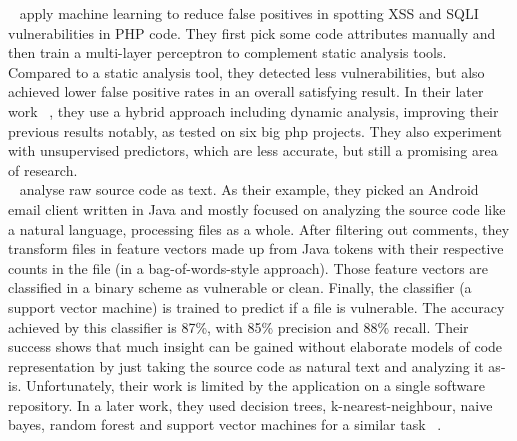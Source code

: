 \documentclass[
	a4paper,
	pagesize,
	pdftex,
	12pt,
	twoside, %
	BCOR=5mm, %
	ngerman,
	fleqn,
	final,
	]{scrartcl}
\begin{document}
~\cite{Shar.2013b} apply machine learning to reduce false positives in spotting XSS and SQLI vulnerabilities in PHP code. They first pick some code attributes manually and then train a multi-layer perceptron to complement static analysis tools. Compared to a static analysis tool, they detected less vulnerabilities, but also achieved lower false positive rates in an overall satisfying result. In their later work ~\cite{Shar.2013}, they use a hybrid approach including dynamic analysis, improving their previous results notably, as tested on six big php projects. They also experiment with unsupervised predictors, which are less accurate, but still a promising area of research. \\
~\cite{Hovsepyan.2012} analyse raw source code as text. As their example, they picked an Android email client written in Java and mostly focused on analyzing the source code like a natural language, processing files as a whole. After filtering out comments, they transform files in feature vectors made up from Java tokens with their respective counts in the file (in a bag-of-words-style approach). Those feature vectors are classified in a binary scheme as vulnerable or clean. Finally, the classifier (a support vector machine) is trained to predict if a file is vulnerable. The accuracy achieved by this classifier is 87\%, with 85\% precision and 88\% recall. Their success shows that much insight can be gained without elaborate models of code representation by just taking the source code as natural text and analyzing it as-is. Unfortunately, their work is limited by the application on a single software repository. In a later work, they used decision trees, k-nearest-neighbour, naive bayes, random forest and support vector machines for a similar task ~\cite{Scandariato.2014}.\\
\end{document}
